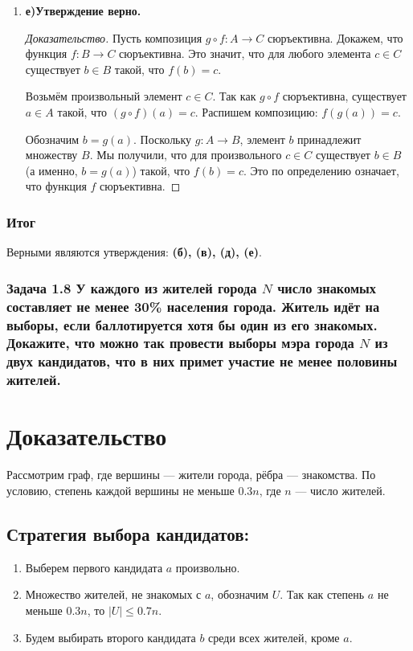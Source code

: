 \documentclass[12pt]{article}
\begin{document}
\begin{enumerate}[label=(\asbuk*)]
    \item \textbf{е)Утверждение верно.}
    
    \begin{proof}[Доказательство]
    Пусть композиция $g \circ f \colon A \to C$ сюръективна. Докажем, что функция $f \colon B \to C$ сюръективна.
    Это значит, что для любого элемента $c \in C$ существует $b \in B$ такой, что $f(b) = c$.
    
    Возьмём произвольный элемент $c \in C$.
    Так как $g \circ f$ сюръективна, существует $a \in A$ такой, что $(g \circ f)(a) = c$.
    Распишем композицию: $f(g(a)) = c$.
    
    Обозначим $b = g(a)$. Поскольку $g \colon A \to B$, элемент $b$ принадлежит множеству $B$.
    Мы получили, что для произвольного $c \in C$ существует $b \in B$ (а именно, $b=g(a)$) такой, что $f(b) = c$.
    Это по определению означает, что функция $f$ сюръективна.
    \end{proof}
\end{enumerate}

\subsubsection*{Итог}
Верными являются утверждения: \textbf{(б), (в), (д), (е)}.

\subsubsection*{Задача 1.8 У каждого из жителей города $N$ число знакомых составляет не менее 30\% населения города. Житель идёт на выборы, если баллотируется хотя бы один из его знакомых. Докажите, что можно так провести выборы мэра города $N$ из двух кандидатов, что в них примет участие не менее половины жителей.}
\section*{Доказательство}

Рассмотрим граф, где вершины — жители города, рёбра — знакомства.  
По условию, степень каждой вершины не меньше \( 0.3n \), где \( n \) — число жителей.

\subsection*{Стратегия выбора кандидатов:}

\begin{enumerate}
    \item Выберем первого кандидата \( a \) произвольно.
    \item Множество жителей, не знакомых с \( a \), обозначим \( U \). Так как степень \( a \) не меньше \( 0.3n \), то \( |U| \leq 0.7n \).
    \item Будем выбирать второго кандидата \( b \) среди всех жителей, кроме \( a \).
\end{enumerate}
\end{document}
